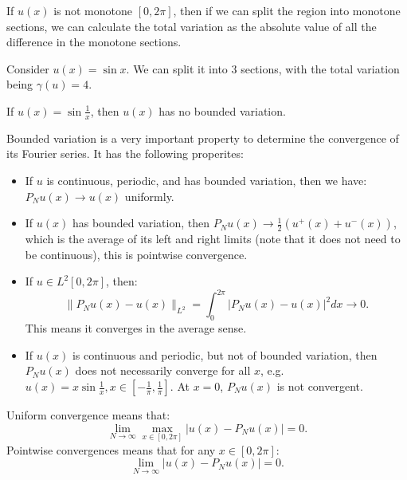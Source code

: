 \documentclass[../main/main.tex]{subfiles}
\begin{document}
        \begin{remark}
            If $u(x)$ is not monotone $[0,2\pi]$, then if we can split the region into monotone sections, we can calculate the total variation as the absolute value of all the difference in the monotone sections.
        \end{remark}
        \begin{example}
            Consider $u(x) = \sin x$. We can split it into 3 sections, with the total variation being $\gamma(u) = 4$.
        \end{example}
        \begin{example}
            If $u(x) = \sin \frac{1}{x}$, then $u(x)$ has no bounded variation.
        \end{example}
            Bounded variation is a very important property to determine the convergence of its Fourier series. It has the following properites: 
            \begin{itemize}
                \item If $u$ is continuous, periodic, and has bounded variation, then we have: $P_Nu(x) \to  u(x) $ uniformly.
                \item If $u(x)$ has bounded variation, then  $P_Nu(x) \to  \frac{1}{2}(u^+(x) + u^-(x))$, which is the average of its left and right limits (note that it does not need to be continuous), this is pointwise convergence.
                \item If $u \in  L^2[0,2\pi]$, then: \[
                        \|P_Nu(x) - u(x)\|_{L^2} = \int ^{2\pi}_0 |P_N u(x) - u(x)|^2dx \to  0 
                .\] This means it converges in the average sense.
            \item If $u(x)$ is continuous and periodic, but not of bounded variation, then $P_Nu(x)$ does not  necessarily converge for all $x$, e.g.  $u(x) = x\sin \frac{1}{x}, x \in [-\frac{1}{\pi} , \frac{1}{\pi}]$. At $x=0$,  $P_Nu(x)$ is not convergent.
            \end{itemize} 
            \begin{remark}
                Uniform convergence means that: \[
                    \lim\limits_{N \to \infty} \max_{x \in [0,2\pi]} |u(x) - P_N u(x) | = 0
                .\] 
                Pointwise convergences means that for any $x \in [0,2\pi]$: \[
                    \lim\limits_{N \to \infty} |u(x) - P_Nu(x) | = 0
                .\] 
            \end{remark}
\end{document}
